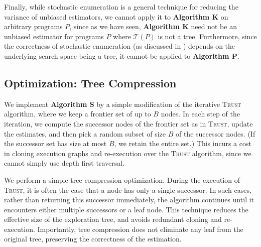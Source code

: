 \documentclass[acmsmall]{acmart}
\newcommand{\trust}{\textsc{Trust}\xspace}
\begin{document}
Finally, while stochastic enumeration is a general technique for reducing the variance of unbiased estimators, we cannot apply it to \textbf{Algorithm K} on arbitrary programs $P$, since as we have seen, \textbf{Algorithm K} need not be an unbiased estimator for programs $P$ where $\mathcal{T}(P)$ is not a tree.
Furthermore, since the correctness of stochastic enumeration (as discussed in \cite{rubinstein,vaisman2017}) depends on the underlying search space being a tree, it cannot be applied to \textbf{Algorithm P}. 


\subsection{Optimization: Tree Compression}

We implement \textbf{Algorithm S} by a simple modification of the iterative \trust algorithm, where we keep 
a frontier set of up to $B$ nodes.
In each step of the iteration, we compute the successor nodes of the frontier set as in \trust, update the estimates,
and then pick a random subset of size $B$ of the successor nodes.
(If the successor set has size at most $B$, we retain the entire set.)
This incurs a cost in cloning execution graphs and re-execution over the \trust algorithm, since we cannot simply use depth first traversal.

We perform a simple tree compression optimization.
During the execution of \trust, it is often the case that a node has only a single successor.
In such cases, rather than returning this successor immediately,  
the algorithm continues until it encounters either multiple successors or a leaf node.
This technique reduces the effective size of the exploration tree, and avoids redundant cloning and re-execution.
Importantly, tree compression does not eliminate any leaf from the original tree, preserving the correctness of the estimation.
%
\end{document}
